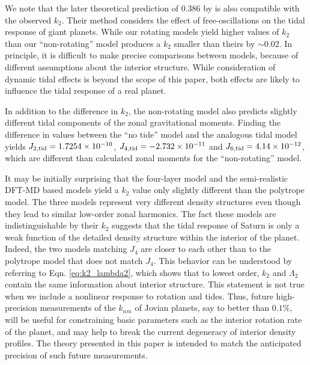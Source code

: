 We note that the later theoretical prediction of 0.386 by \citet{vorontsov1984} is
also compatible with the observed $k_2$. Their method considers the effect of
free-oscillations on the tidal response of giant planets. While our rotating models
yield higher values of $k_2$ than \citet{vorontsov1984} our ``non-rotating'' model
produces a $k_2$ smaller than theirs by $\sim$0.02. In principle, it is difficult to
make precise comparisons between models, because of different assumptions about the
interior structure. While consideration of dynamic tidal effects is beyond the scope
of this paper, both effects are likely to influence the tidal response of a real
planet.

In addition to the difference in $k_2$, the non-rotating model also predicts slightly
different tidal components of the zonal gravitational moments. Finding the difference
in values between the ``no tide'' model and the analogous tidal model yields
$J_{2,{\rm tid}}=1.7254\times10^{-10}$, $J_{4,{\rm tid}}=-2.732\times10^{-11}$ and
$J_{6,{\rm tid}}=4.14\times10^{-12}$, which are different than calculated zonal
moments for the ``non-rotating'' model.

It may be initially surprising that the four-layer model and the semi-realistic
DFT-MD based models  yield a $k_2$ value only slightly different than the
polytrope model. The three models represent very different density structures
even though they lead to similar low-order zonal harmonics. The fact these
models are indistinguishable by their $k_2$ suggests that the tidal response of
Saturn is only a weak function of the detailed density structure within the
interior of the planet. Indeed, the two models matching $J_4$ are closer to
each other than to the polytrope model that does not match $J_4$. This behavior
can be understood by referring to Eqn.  \eqref{eq:k2_lambda2}, which shows that
to lowest order, $k_2$ and $\Lambda_2$ contain the same information about
interior structure.  This statement is not true when we include a nonlinear
response to rotation and tides.  Thus, future high-precision measurements of
the $k_{nm}$ of Jovian planets, say to better than $0.1\%$, will be useful for
constraining basic parameters such as the interior rotation rate of the planet,
and may help to break the current degeneracy of interior density profiles.  The
theory presented in this paper is intended to match the anticipated precision
of such future measurements.


